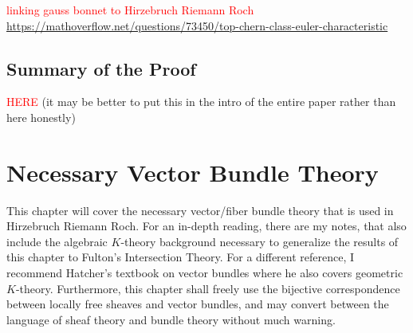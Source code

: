 \documentclass{book}
\newcommand{\C}{{\mathbb{C}}}
\begin{document}
%

\textcolor{red}{linking gauss bonnet to Hirzebruch Riemann Roch}
\url{https://mathoverflow.net/questions/73450/top-chern-class-euler-characteristic}

\section{Summary of the Proof}

\textcolor{red}{HERE} (it may be better to put this in the intro of the entire paper rather than here
honestly)

%
%
%
%
%
%

\chapter{Necessary Vector Bundle Theory}\label{cha:characteristicClass}

This chapter will cover the necessary vector/fiber bundle theory that is used in Hirzebruch Riemann Roch. For
an in-depth reading, there are my notes, \cite{NateKTheory} that also include the algebraic $K$-theory
background necessary to generalize the results of this chapter to Fulton's Intersection Theory. For
a different reference, I recommend Hatcher's textbook on vector bundles \cite{hatcherVectorBundlesKTheory2017}
where he also covers geometric $K$-theory. Furthermore, this chapter shall freely use the bijective
correspondence between locally free sheaves and vector bundles, and may convert between the language of sheaf
theory and bundle theory without much warning.
\end{document}
